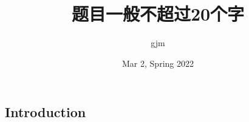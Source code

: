 \documentclass{gjm_report}
\date{Mar 2, Spring 2022}
\title{题目一般不超过20个字}
\author{gjm}
\begin{document}
\maketitle
\begin{multicols}{2}

\section{Introduction}
  
\end{multicols}
\end{document}
